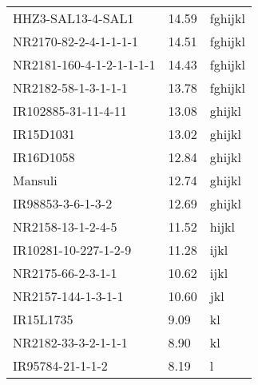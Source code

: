 \documentclass[]{article}
\begin{document}
\begin{longtable}{lll}
HHZ3-SAL13-4-SAL1 & 14.59 & fghijkl\\
\rowcolor{gray!6}  NR2170-82-2-4-1-1-1-1 & 14.51 & fghijkl\\
NR2181-160-4-1-2-1-1-1-1 & 14.43 & fghijkl\\
\addlinespace
\rowcolor{gray!6}  NR2182-58-1-3-1-1-1 & 13.78 & fghijkl\\
IR102885-31-11-4-11 & 13.08 & ghijkl\\
\rowcolor{gray!6}  IR15D1031 & 13.02 & ghijkl\\
IR16D1058 & 12.84 & ghijkl\\
\rowcolor{gray!6}  Mansuli & 12.74 & ghijkl\\
\addlinespace
IR98853-3-6-1-3-2 & 12.69 & ghijkl\\
\rowcolor{gray!6}  NR2158-13-1-2-4-5 & 11.52 & hijkl\\
IR10281-10-227-1-2-9 & 11.28 & ijkl\\
\rowcolor{gray!6}  NR2175-66-2-3-1-1 & 10.62 & ijkl\\
NR2157-144-1-3-1-1 & 10.60 & jkl\\
\addlinespace
\rowcolor{gray!6}  IR15L1735 & 9.09 & kl\\
NR2182-33-3-2-1-1-1 & 8.90 & kl\\
\rowcolor{gray!6}  IR95784-21-1-1-2 & 8.19 & l\\
\bottomrule
\end{longtable}
\endgroup{}
\begingroup\fontsize{12}{14}\selectfont
\end{document}
